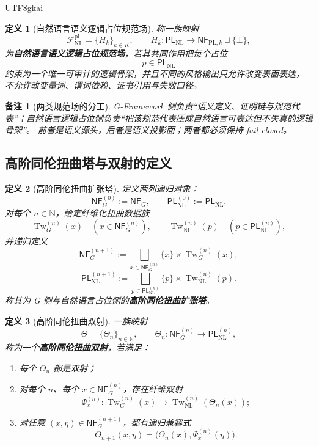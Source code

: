 \documentclass[12pt]{article}
\newtheorem{definition}{定义}[section]
\newtheorem{remark}{备注}[section]
\newcommand{\NN}{\mathbb{N}}
\newcommand{\GFramework}{\textsf{G-Framework}}
\newcommand{\Tw}{\operatorname{Tw}}
\begin{document}
\begin{CJK*}{UTF8}{gkai}
\begin{definition}[自然语言语义逻辑占位规范场]
称一族映射
\[
  \mathcal{F}^{\mathrm{pl}}_{\mathrm{NL}}=\{H_k\}_{k\in K},
  \qquad
  H_k:\mathsf{PL}_{\mathrm{NL}}\to \mathsf{NF}_{\mathrm{PL},k}\sqcup\{\bot\},
\]
为\textbf{自然语言语义逻辑占位规范场}，若其共同作用把每个占位
\[
  p\in\mathsf{PL}_{\mathrm{NL}}
\]
约束为一个唯一可审计的逻辑骨架，并且不同的风格输出只允许改变表面表达，
不允许改变量词、谓词依赖、证书引用与失败口径。
\end{definition}

\begin{remark}[两类规范场的分工]
\GFramework{} 侧负责“语义定义、证明链与规范代表”；自然语言逻辑占位侧负责“把该规范代表压成自然语言可表达但不失真的逻辑骨架”。
前者是语义源头，后者是语义投影面；两者都必须保持 fail-closed。
\end{remark}

\subsection{高阶同伦扭曲塔与双射的定义}
\label{subsec:tex37-twist}

\begin{definition}[高阶同伦扭曲扩张塔]
\label{def:tex37-twist-tower}
定义两列递归对象：
\[
  \mathsf{NF}_G^{(0)}:=\mathsf{NF}_G,
  \qquad
  \mathsf{PL}_{\mathrm{NL}}^{(0)}:=\mathsf{PL}_{\mathrm{NL}}.
\]
对每个 $n\in\NN$，给定纤维化扭曲数据族
\[
  \Tw_G^{(n)}(x)\quad (x\in \mathsf{NF}_G^{(n)}),
  \qquad
  \Tw_{\mathrm{NL}}^{(n)}(p)\quad (p\in \mathsf{PL}_{\mathrm{NL}}^{(n)}),
\]
并递归定义
\[
  \mathsf{NF}_G^{(n+1)}
  :=
  \bigsqcup_{x\in \mathsf{NF}_G^{(n)}}\{x\}\times \Tw_G^{(n)}(x),
\]
\[
  \mathsf{PL}_{\mathrm{NL}}^{(n+1)}
  :=
  \bigsqcup_{p\in \mathsf{PL}_{\mathrm{NL}}^{(n)}}\{p\}\times \Tw_{\mathrm{NL}}^{(n)}(p).
\]
称其为 G 侧与自然语言占位侧的\textbf{高阶同伦扭曲扩张塔}。
\end{definition}

\begin{definition}[高阶同伦扭曲双射]
\label{def:tex37-high-twist-bijection}
一族映射
\[
  \Theta=\{\Theta_n\}_{n\in\NN},
  \qquad
  \Theta_n:\mathsf{NF}_G^{(n)}\to \mathsf{PL}_{\mathrm{NL}}^{(n)},
\]
称为一个\textbf{高阶同伦扭曲双射}，若满足：
\begin{enumerate}
  \item 每个 $\Theta_n$ 都是双射；
  \item 对每个 $n$、每个 $x\in\mathsf{NF}_G^{(n)}$，存在纤维双射
  \[
    \Psi_x^{(n)}:\Tw_G^{(n)}(x)\to \Tw_{\mathrm{NL}}^{(n)}(\Theta_n(x));
  \]
  \item 对任意 $(x,\eta)\in \mathsf{NF}_G^{(n+1)}$，都有递归兼容式
  \[
    \Theta_{n+1}(x,\eta)=\bigl(\Theta_n(x),\Psi_x^{(n)}(\eta)\bigr).
  \]
\end{enumerate}
\end{definition}


\end{CJK*}
\end{document}
